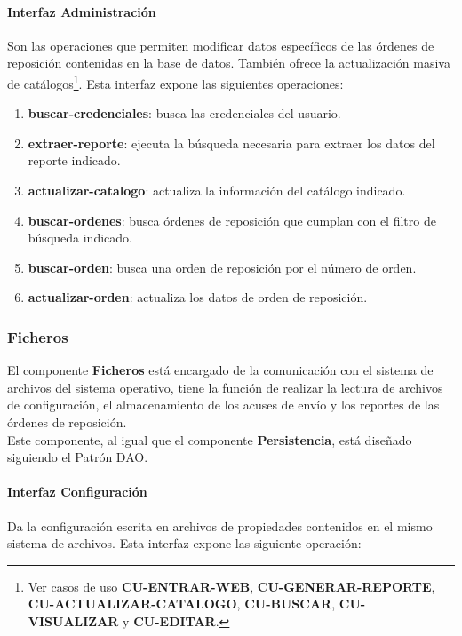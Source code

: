 \paragraph{\indent Interfaz Administración\\}
Son las operaciones que permiten modificar datos específicos de las órdenes de reposición contenidas en la base de datos. También ofrece la actualización masiva de catálogos\footnote{Ver casos de uso \textbf{CU-ENTRAR-WEB}, \textbf{CU-GENERAR-REPORTE}, \textbf{CU-ACTUALIZAR-CATALOGO}, \textbf{CU-BUSCAR}, \textbf{CU-VISUALIZAR} y \textbf{CU-EDITAR}.}. Esta interfaz expone las siguientes operaciones:
\begin{enumerate}
	\item \textbf{buscar-credenciales}: busca las credenciales del usuario.
	\item \textbf{extraer-reporte}: ejecuta la búsqueda necesaria para extraer los datos del reporte indicado.
	\item \textbf{actualizar-catalogo}: actualiza la información del catálogo indicado.
	\item \textbf{buscar-ordenes}: busca órdenes de reposición que cumplan con el filtro de búsqueda indicado.
	\item \textbf{buscar-orden}: busca una orden de reposición por el número de orden.
	\item \textbf{actualizar-orden}: actualiza los datos de orden de reposición.
\end{enumerate}

\subsubsection{Ficheros}
El componente \textbf{Ficheros} está encargado de la comunicación con el sistema de archivos del sistema operativo, tiene la función de realizar la lectura de archivos de configuración, el almacenamiento de los acuses de envío y los reportes de las órdenes de reposición.\\
Este componente, al igual que el componente \textbf{Persistencia}, está diseñado siguiendo el Patrón DAO.

\paragraph{\indent Interfaz Configuración\\}
Da la configuración escrita en archivos de propiedades contenidos en el mismo sistema de archivos. Esta interfaz expone las siguiente operación:

